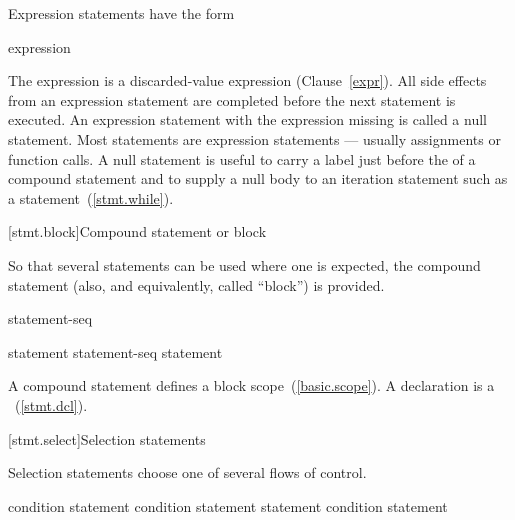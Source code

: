 \pnum
Expression statements have the form

\begin{bnf}
\br
    expression\opt \terminal{;}
\end{bnf}

The expression is
a discarded-value expression (Clause~\ref{expr}).
All
%
side effects from an expression statement
are completed before the next statement is executed.
%
%
An expression statement with the expression missing is called a null
statement.
\enternote
Most statements are expression statements --- usually assignments or
function calls. A null statement is useful to carry a label just before
the \tcode{\}} of a compound statement and to supply a null body to an
iteration statement such as a 
statement~(\ref{stmt.while}).
\exitnote

[stmt.block]{Compound statement or block}%
%
%

\pnum
So that several statements can be used where one is expected, the
compound statement (also, and equivalently, called ``block'') is
provided.

\begin{bnf}
\br
    \terminal{\{} statement-seq\opt \terminal{\}}
\end{bnf}

\begin{bnf}
\br
    statement\br
    statement-seq statement
\end{bnf}

A compound statement defines a block scope~(\ref{basic.scope}).
\enternote
A declaration is a ~(\ref{stmt.dcl}).
\exitnote

[stmt.select]{Selection statements}%

\pnum
Selection statements choose one of several flows of control.

%
%
%
\begin{bnf}
\br
     condition \terminal{)} statement\br
     condition \terminal{)} statement  statement\br
     condition \terminal{)} statement
\end{bnf}

